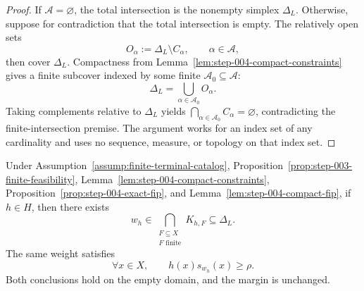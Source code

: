 \begin{proof}
If $\mathcal A=\varnothing$, the total intersection is the nonempty simplex
$\Delta_L$.  Otherwise, suppose for contradiction that the total
intersection is empty.  The relatively open sets
\[
O_\alpha:=\Delta_L\setminus C_\alpha,
\qquad \alpha\in\mathcal A,
\]
then cover $\Delta_L$.  Compactness from
Lemma~\ref{lem:step-004-compact-constraints} gives a finite subcover indexed
by some finite $\mathcal A_0\subseteq\mathcal A$:
\[
\Delta_L=\bigcup_{\alpha\in\mathcal A_0}O_\alpha.
\]
Taking complements relative to $\Delta_L$ yields
$\bigcap_{\alpha\in\mathcal A_0}C_\alpha=\varnothing$, contradicting the
finite-intersection premise.  The argument works for an index set of any
cardinality and uses no sequence, measure, or topology on that index set.
\end{proof}

\begin{proposition}
\label{prop:step-004-global-weight}
Under Assumption~\ref{assump:finite-terminal-catalog},
Proposition~\ref{prop:step-003-finite-feasibility},
Lemma~\ref{lem:step-004-compact-constraints},
Proposition~\ref{prop:step-004-exact-fip}, and
Lemma~\ref{lem:step-004-compact-fip}, if $h\in H$, then there exists
\begin{equation}\label{eq:global-weight-intersection}
w_h\in
\bigcap_{\substack{F\subseteq X\\F\text{ finite}}}K_{h,F}
\subseteq\Delta_L.
\end{equation}
The same weight satisfies
\begin{equation}\label{eq:global-score-margin}
\forall x\in X,\qquad h(x)s_{w_h}(x)\ge\rho.
\end{equation}
Both conclusions hold on the empty domain, and the margin is unchanged.
\end{proposition}

